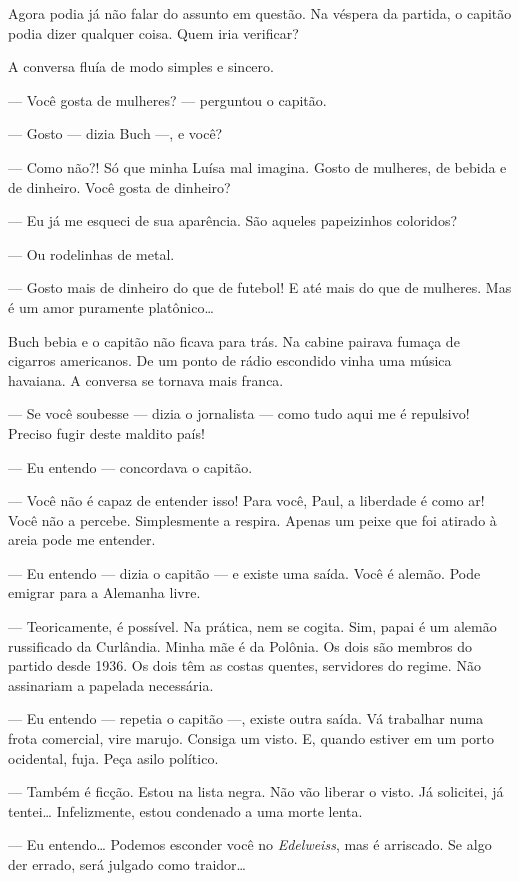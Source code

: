 Agora podia já não falar do assunto em questão. Na véspera da partida, o
capitão podia dizer qualquer coisa. Quem iria verificar?

A conversa fluía de modo simples e sincero.

--- Você gosta de mulheres? --- perguntou o capitão.

--- Gosto --- dizia Buch ---, e você?

--- Como não?! Só que minha Luísa mal imagina. Gosto de mulheres, de
bebida e de dinheiro. Você gosta de dinheiro?

--- Eu já me esqueci de sua aparência. São aqueles papeizinhos
coloridos?

--- Ou rodelinhas de metal.

--- Gosto mais de dinheiro do que de futebol! E até mais do que de
mulheres. Mas é um amor puramente platônico\ldots{}

Buch bebia e o capitão não ficava para trás. Na cabine pairava fumaça de
cigarros americanos. De um ponto de rádio escondido vinha uma música
havaiana. A conversa se tornava mais franca.

--- Se você soubesse --- dizia o jornalista --- como tudo aqui me é
repulsivo! Preciso fugir deste maldito país!

--- Eu entendo --- concordava o capitão.

--- Você não é capaz de entender isso! Para você, Paul, a liberdade é
como ar! Você não a percebe. Simplesmente a respira. Apenas um peixe que
foi atirado à areia pode me entender.

--- Eu entendo --- dizia o capitão --- e existe uma saída. Você é
alemão. Pode emigrar para a Alemanha livre.

--- Teoricamente, é possível. Na prática, nem se cogita. Sim, papai é um
alemão russificado da Curlândia. Minha mãe é da Polônia. Os dois são
membros do partido desde 1936. Os dois têm as costas quentes, servidores
do regime. Não assinariam a papelada necessária.

--- Eu entendo --- repetia o capitão ---, existe outra saída. Vá
trabalhar numa frota comercial, vire marujo. Consiga um visto. E, quando
estiver em um porto ocidental, fuja. Peça asilo político.

--- Também é ficção. Estou na lista negra. Não vão liberar o visto. Já
solicitei, já tentei\ldots{} Infelizmente, estou condenado a uma morte lenta.

--- Eu entendo\ldots{} Podemos esconder você no \emph{Edelweiss}, mas é
arriscado. Se algo der errado, será julgado como traidor\ldots{}

